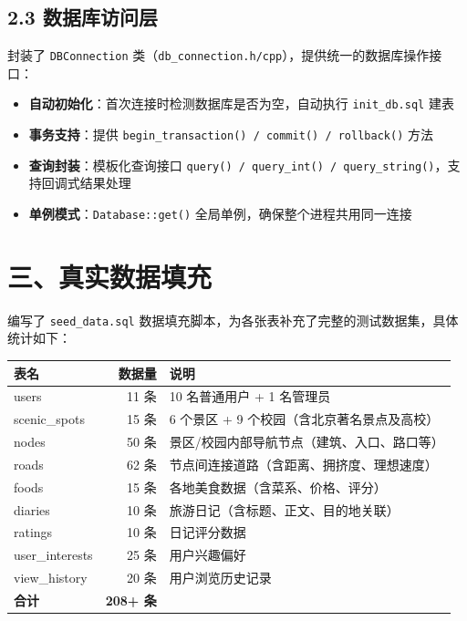 \documentclass[12pt,a4paper]{article}
\begin{document}
\subsection*{2.3 数据库访问层}

封装了 \texttt{DBConnection} 类（\texttt{db\_connection.h/cpp}），提供统一的数据库操作接口：

\begin{itemize}[leftmargin=2em]
    \item \textbf{自动初始化}：首次连接时检测数据库是否为空，自动执行 \texttt{init\_db.sql} 建表
    \item \textbf{事务支持}：提供 \texttt{begin\_transaction() / commit() / rollback()} 方法
    \item \textbf{查询封装}：模板化查询接口 \texttt{query() / query\_int() / query\_string()}，支持回调式结果处理
    \item \textbf{单例模式}：\texttt{Database::get()} 全局单例，确保整个进程共用同一连接
\end{itemize}

\section*{三、真实数据填充}

编写了 \texttt{seed\_data.sql} 数据填充脚本，为各张表补充了完整的测试数据集，具体统计如下：

\begin{center}
\begin{tabular}{l r l}
    \toprule
    \bfseries 表名 & \bfseries 数据量 & \bfseries 说明 \\
    \midrule
    users & 11 条 & 10 名普通用户 + 1 名管理员 \\
    scenic\_spots & 15 条 & 6 个景区 + 9 个校园（含北京著名景点及高校） \\
    nodes & 50 条 & 景区/校园内部导航节点（建筑、入口、路口等） \\
    roads & 62 条 & 节点间连接道路（含距离、拥挤度、理想速度） \\
    foods & 15 条 & 各地美食数据（含菜系、价格、评分） \\
    diaries & 10 条 & 旅游日记（含标题、正文、目的地关联） \\
    ratings & 10 条 & 日记评分数据 \\
    user\_interests & 25 条 & 用户兴趣偏好 \\
    view\_history & 20 条 & 用户浏览历史记录 \\
    \midrule
    \textbf{合计} & \textbf{208+ 条} & \\
    \bottomrule
\end{tabular}
\end{center}
\end{document}
